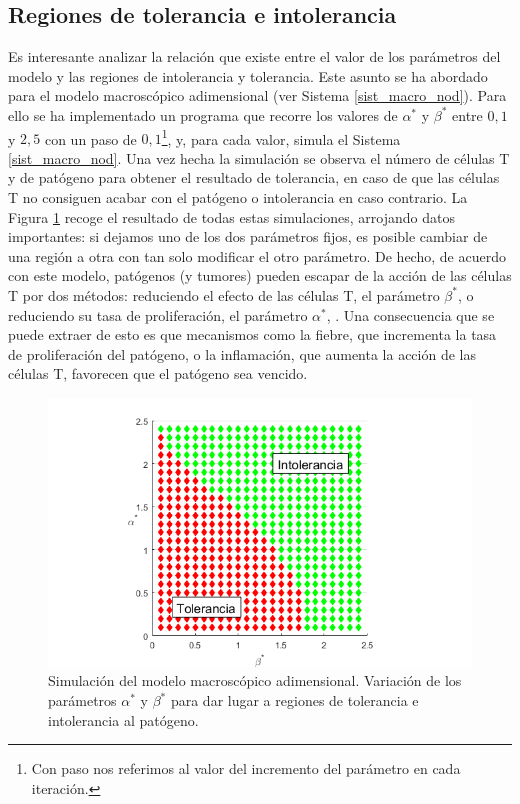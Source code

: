\subsection{Regiones de tolerancia e intolerancia}
\label{sub:reg_tolerIntolerMacro}

Es interesante analizar la relación que existe entre el valor de los parámetros del modelo y las regiones de intolerancia y tolerancia. Este asunto se ha abordado para el modelo macroscópico adimensional (ver Sistema \ref{sist_macro_nod}). Para ello se ha implementado un programa que recorre los valores de $\alpha^{*}$ y $\beta^{*}$ entre $0,1$ y $2,5$ con un paso de $0,1$\footnote{Con paso nos referimos al valor del incremento del parámetro en cada iteración.}, y, para cada valor, simula el Sistema \ref{sist_macro_nod}. Una vez hecha la simulación se observa el número de células T y de patógeno para obtener el resultado de tolerancia, en caso de que las células T no consiguen acabar con el patógeno o intolerancia en caso contrario. La Figura \ref{fig:macro_toler_intoler} recoge el resultado de todas estas simulaciones, arrojando datos importantes: si dejamos uno de los dos parámetros fijos, es posible cambiar de una región a otra con tan solo modificar el otro parámetro. De hecho, de acuerdo con este modelo, patógenos (y tumores) pueden escapar de la acción de las células T por dos métodos: reduciendo el efecto de las células T, el parámetro $\beta^{*}$, o reduciendo su tasa de proliferación, el parámetro $\alpha^{*}$, \citep{arias2016emergent}. Una consecuencia que se puede extraer de esto es que mecanismos como la fiebre, que incrementa la tasa de proliferación del patógeno, o la inflamación, que aumenta la acción de las células T, favorecen que el patógeno sea vencido. 

\begin{figure}[t]
	\centering
	\includegraphics[width=1\textwidth]{Imagenes/Simulaciones/macro_toler_intoler}
	\caption{Simulación del modelo macroscópico adimensional. Variación de los parámetros $\alpha^{*}$ y $\beta^{*}$ para dar lugar a regiones de tolerancia e intolerancia al patógeno.}
	\label{fig:macro_toler_intoler}
\end{figure}